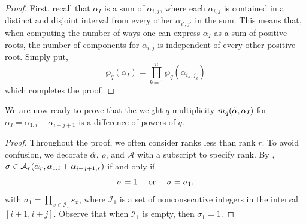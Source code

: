 \documentclass[10pt]{article}
\newcommand{\hr}[0]{\Tilde{\alpha}}
\begin{document}
\begin{proof}
    
    First, recall that $\alpha_I$ is a sum of $\alpha_{i,j}$, where each $\alpha_{i,j}$ is contained in a distinct and disjoint interval from every other $\alpha_{i',j'}$ in the sum. This means that, when computing the number of ways one can express $\alpha_I$ as a sum of positive roots, the number of components for $\alpha_{i,j}$ is independent of every other positive root. Simply put,
    \[\wp_q(\alpha_I)=\prod_{k=1}^n\wp_q(\alpha_{i_k,j_k})\]
    which completes the proof.
\end{proof}
We are now ready to prove that the weight $q$-multiplicity $m_q(\hr,\alpha_I)$ for $\alpha_I=\alpha_{1,i}+\alpha_{i+j+1}$ is a difference of powers of $q$. 

\difference
\begin{proof}
    Throughout the proof, we often consider ranks less than rank $r$. To avoid confusion, we decorate
    $\hr$, $\rho$, and $\mathcal{A}$ with a subscript 
    to specify rank. 
    By , $\sigma\in\mathcal{A}_r(\hr_r,\alpha_{1,i}+\alpha_{i+j+1,r})$ if and only if 
    \begin{equation}
        \sigma = 1 \quad \text{ or } \quad \sigma=\sigma_1,\notag
    \end{equation}
    with  
    $\sigma_1=\prod_{x\in\mathcal{I}_1}s_x$, 
    where $\mathcal{I}_1$  
    is a set of nonconsecutive integers in the interval $[i+1,i+j]$. Observe that when $\mathcal{I}_1$ is empty, then $\sigma_1=1$.
    

\end{proof}
\end{document}
